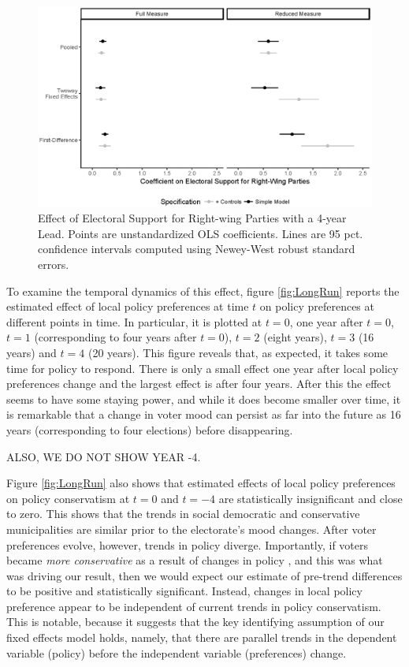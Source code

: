 \documentclass[a4paper,12pt]{article}
\begin{document}
\begin{figure}[h]
	\centering
	\includegraphics[scale = 0.8]{coef_11092018.eps}
	\caption{Effect of Electoral Support for Right-wing Parties with a 4-year Lead. Points are unstandardized OLS coefficients. Lines are 95 pct. confidence intervals computed using Newey-West robust standard errors.}
	\label{fig:FourYearLead}
\end{figure}


To examine the temporal dynamics of this effect, figure \ref{fig:LongRun} reports the estimated effect of local policy preferences at time $t$ on policy preferences at different points in time. In particular, it is plotted at $t=0$, one year after $t=0$, $t=1$ (corresponding to four years after $t=0$), $t=2$ (eight years), $t=3$ (16 years) and $t=4$ (20 years). This figure reveals that, as expected, it takes some time for policy to respond. There is only a small effect one year after local policy preferences change and the largest effect is  after four years. After this the effect seems to have some staying power, and while it does become smaller over time, it is remarkable that a change in voter mood can persist as far into the future as 16 years (corresponding to four elections) before disappearing.

ALSO, WE DO NOT SHOW YEAR -4.

Figure \ref{fig:LongRun} also shows that estimated effects of local policy preferences on policy conservatism at $t=0$ and $t=-4$ are statistically insignificant and close to zero. This shows that the trends in social democratic and conservative municipalities are similar prior to the electorate's mood changes. After voter preferences evolve, however, trends in policy diverge. Importantly, if voters became \emph{more conservative} as a result of changes in policy \cite[cf.][]{lenz2013follow,slothuus2010can}, and this was what was driving our result, then we would expect our estimate of pre-trend differences to be positive and statistically significant. Instead, changes in local policy preference appear to be independent of current trends in policy conservatism. This is notable, because it suggests that the key identifying assumption of our fixed effects model holds, namely, that there are parallel trends in the dependent variable (policy) before the independent variable (preferences) change.
\end{document}
